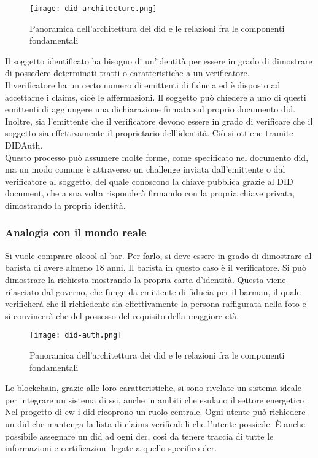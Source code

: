 \begin{figure}[ht]
    \texttt{[image: did-architecture.png]}
    \centering
    \caption{Panoramica dell'architettura dei \gls{did} e le relazioni fra le componenti fondamentali \cite{img:did-architecture}}
    \label{lab:did-architecture}
\end{figure}

Il soggetto identificato ha bisogno di un’identità per essere in grado di dimostrare di possedere determinati tratti o caratteristiche a un verificatore. \\
Il verificatore ha un certo numero di emittenti di fiducia ed è disposto ad accettarne i claims, cioè le affermazioni.
Il soggetto può chiedere a uno di questi emittenti di aggiungere una dichiarazione firmata sul proprio documento \gls{did}. 
Inoltre, sia l'emittente che il verificatore devono essere in grado di verificare che il soggetto sia effettivamente il proprietario dell'identità. 
Ciò si ottiene tramite DIDAuth. \\
Questo processo può assumere molte forme, come specificato nel documento \gls{did}, ma un modo comune è attraverso un challenge inviata dall'emittente o dal verificatore al soggetto, 
del quale conoscono la chiave pubblica grazie al DID document, che a sua volta risponderà firmando con la propria chiave privata, dimostrando la propria identità.

\subsubsection {Analogia con il mondo reale} 
Si vuole comprare alcool al bar. Per farlo, si deve essere in grado di dimostrare al barista di avere almeno 18 anni. Il barista in questo caso è il verificatore.
Si può dimostrare la richiesta mostrando la propria carta d'identità.
Questa viene rilasciato dal governo, che funge da emittente di fiducia per il barman, 
il quale verificherà che il richiedente sia effettivamente la persona raffigurata nella foto e si convincerà che del possesso del requisito della maggiore età.

\begin{figure}[ht]
    \texttt{[image: did-auth.png]}
    \centering
    \caption{Panoramica dell'architettura dei \gls{did} e le relazioni fra le componenti fondamentali \cite{img:did-auth}}
    \label{lab:did-auth}
\end{figure}

Le blockchain, grazie alle loro caratteristiche, si sono rivelate un sistema ideale per integrare un sistema di \gls{ssi}, anche in ambiti che esulano il settore energetico \cite{art:blockchain-did}. \\
Nel progetto di \gls{ew} i \gls{did} ricoprono un ruolo centrale. 
Ogni utente può richiedere un \gls{did} che mantenga la lista di claims verificabili che l'utente possiede.
È anche possibile assegnare un \gls{did} ad ogni \gls{der}, così da tenere traccia di tutte le informazioni e certificazioni legate a quello specifico \gls{der}. \\

